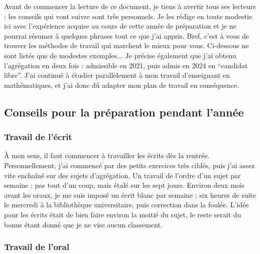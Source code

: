 




  Avant de commencer la lecture de ce document, je tiens à avertir tous ses lecteurs : les conseils qui vont suivre sont très personnels. Je les rédige en toute modestie ici avec l'expérience acquise au cours de cette année de préparation et je ne pourrai résumer à quelques phrases tout ce que j'ai appris. Bref, c'est à vous de trouver les méthodes de travail qui marchent le mieux pour vous. Ci-dessous ne sont listés que de modestes exemples...
  \newpar
  Je précise également que j'ai obtenu l'agrégation en deux fois : admissible en 2021, puis admis en 2024 en ``candidat libre''. J'ai continué à étudier parallèlement à mon travail d'enseignant en mathématiques, et j'ai donc dû adapter mon plan de travail en conséquence.

  \subsection{Conseils pour la préparation pendant l'année}

  \subsubsection{Travail de l'écrit}

  À mon sens, il faut commencer à travailler les écrits dès la rentrée. Personnellement, j'ai commencé par des petits exercices très ciblés, puis j'ai assez vite enchaîné sur des sujets d'agrégation. Un travail de l'ordre d'un sujet par semaine ; pas tout d'un coup, mais étalé sur les sept jours. Environ deux mois avant les oraux, je me suis imposé un écrit blanc par semaine : six heures de suite le mercredi à la bibliothèque universitaire, puis correction dans la foulée.
  \newpar
  L'idée pour les écrits était de bien faire environ la moitié du sujet, le reste serait du bonus étant donné que je ne vise aucun classement.

  \subsubsection{Travail de l'oral}

